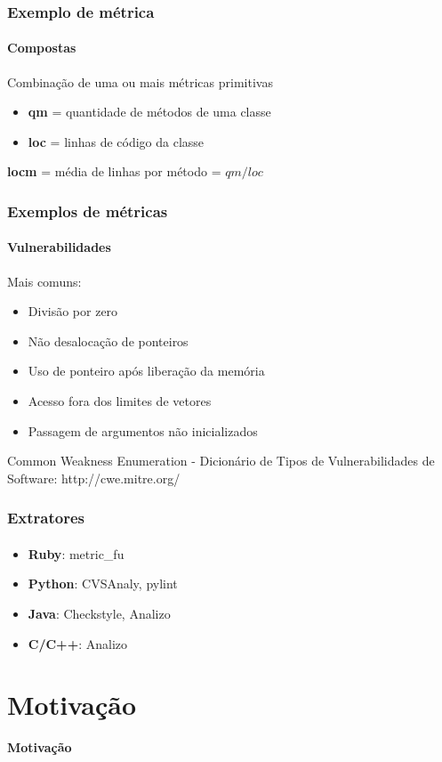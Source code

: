 \documentclass{beamer}
\begin{document}
  \begin{frame}
    \frametitle{Exemplo de métrica}
    \framesubtitle{Compostas}

    Combinação de uma ou mais métricas primitivas

    \begin{itemize}
      \item \textbf{qm} = quantidade de métodos de uma classe
      \item \textbf{loc} = linhas de código da classe
    \end{itemize}

    \textbf{locm} = média de linhas por método = $qm / loc$
  \end{frame}

  \begin{frame}
    \frametitle{Exemplos de métricas}
    \framesubtitle{Vulnerabilidades}

    Mais comuns:
    \begin{itemize}
      \item Divisão por zero
      \item Não desalocação de ponteiros
      \item Uso de ponteiro após liberação da memória
      \item Acesso fora dos limites de vetores 
      \item Passagem de argumentos não inicializados
    \end{itemize}

    Common Weakness Enumeration - Dicionário de Tipos de Vulnerabilidades de Software:
    http://cwe.mitre.org/
  \end{frame}

  \begin{frame}
    \frametitle{Extratores}
    \framesubtitle{}

    \begin{itemize}
      \item \textbf{Ruby}: metric\_fu
      \item \textbf{Python}: CVSAnaly, pylint
      \item \textbf{Java}: Checkstyle, Analizo
      \item \textbf{C/C++}: Analizo
    \end{itemize}
  \end{frame}

\section{Motivação}
\begin{frame}
  \LARGE{\textbf{Motivação}}
\end{frame}
\end{document}
